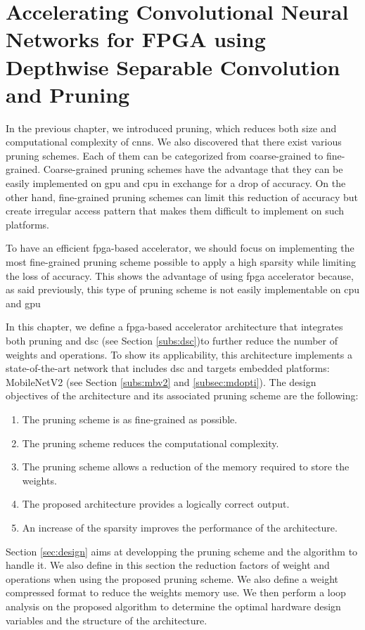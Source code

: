 \chapter{Accelerating Convolutional Neural Networks for FPGA using Depthwise Separable Convolution and Pruning} \label{chap:pratique}
%
%
In the previous chapter, we introduced pruning, which reduces both size and computational complexity of \acrshort{cnn}s. We also discovered that there exist various pruning schemes. Each of them can be categorized from coarse-grained to fine-grained. Coarse-grained pruning schemes have the advantage that they can be easily implemented on \acrshort{gpu} and \acrshort{cpu} in exchange for a drop of accuracy. On the other hand, fine-grained pruning schemes can limit this reduction of accuracy but create irregular access pattern that makes them difficult to implement on such platforms. 

To have an efficient \acrshort{fpga}-based accelerator, we should focus on implementing the most fine-grained pruning scheme possible to apply a high sparsity while limiting the loss of accuracy. This shows the advantage of using \acrshort{fpga} accelerator because, as said previously, this type of pruning scheme is not easily implementable on \acrshort{cpu} and \acrshort{gpu}

In this chapter, we define a \acrshort{fpga}-based accelerator architecture that integrates both pruning and \acrshort{dsc} (see Section \ref{subs:dsc})to further reduce the number of weights and operations. To show its applicability, this architecture implements a state-of-the-art network that includes \acrshort{dsc} and targets embedded platforms: MobileNetV2 (see Section \ref{subs:mbv2} and \ref{subsec:mdopti}). The design objectives of the architecture and its associated pruning scheme are the following:
%
\begin{enumerate}
    \item The pruning scheme is as fine-grained as possible.
    \item The pruning scheme reduces the computational complexity.
    \item The pruning scheme allows a reduction of the memory required to store the weights.
    \item The proposed architecture provides a logically correct output.
    \item An increase of the sparsity improves the performance of the architecture.
\end{enumerate}
%
Section \ref{sec:design} aims at developping the pruning scheme and the algorithm to handle it. We also define in this section the reduction factors of weight and operations when using the proposed pruning scheme. We also define a weight compressed format to reduce the weights memory use. We then perform a loop analysis on the proposed algorithm to determine the optimal hardware design variables and the structure of the architecture.

